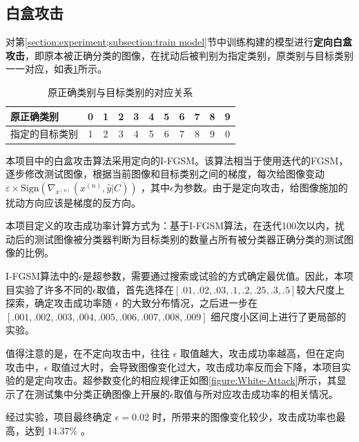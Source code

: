 \documentclass[journal, a4paper]{IEEEtran}
\begin{document}
\subsection{白盒攻击}
\label{section:experiment;subsection:white-box attack}

对第\ref{section:experiment;subsection:train model}节中训练构建的模型进行\textbf{定向白盒攻击}，即原本被正确分类的图像，在扰动后被判别为指定类别，原类别与目标类别一一对应，如表\ref{table:label}所示。

\begin{table}[h]\small
    \centering
    \begin{tabular}{lcccccccccc}
    \toprule
原正确类别 & 0 & 1 & 2 & 3 & 4 & 5 & 6 & 7 & 8 & 9 \\ 
    \midrule
指定的目标类别 & 1 & 2 & 3 & 4 & 5 & 6 & 7 & 8 & 9 & 0 \\
    \bottomrule
    \end{tabular}
    \caption{原正确类别与目标类别的对应关系}
    \label{table:label}
\end{table}

本项目中的白盒攻击算法采用定向的I-FGSM。该算法相当于使用迭代的FGSM，逐步修改测试图像，根据当前图像和目标类别之间的梯度，每次给图像变动 $\varepsilon \times \mathrm{Sign}\left( \nabla_{x^{(n)}}\left({x}^{(n)}, \hat{y} | C \right) \right)$ ，其中$\epsilon$为参数。由于是定向攻击，给图像施加的扰动方向应该是梯度的反方向。

本项目定义的攻击成功率计算方式为：基于I-FGSM算法，在迭代100次以内，扰动后的测试图像被分类器判断为目标类别的数量占所有被分类器正确分类的测试图像的比例。

I-FGSM算法中的$\epsilon$是超参数，需要通过搜索或试验的方式确定最优值。因此，本项目实验了许多不同的$\epsilon$取值，首先选择在$[.01, .02, .03, .1, .2, .25, .3, .5]$较大尺度上探索，确定攻击成功率随 $\epsilon$ 的大致分布情况，之后进一步在 $[.001, .002, .003, .004, .005, .006, .007, .008, .009]$ 细尺度小区间上进行了更局部的实验。

值得注意的是，在不定向攻击中，往往 $\epsilon$ 取值越大，攻击成功率越高，但在定向攻击中，$\epsilon$ 取值过大时，会导致图像变化过大，攻击成功率反而会下降，本项目实验的是定向攻击。超参数变化的相应规律正如图\ref{figure:White-Attack}所示，其显示了在测试集中分类正确图像上开展的$\epsilon$取值与所对应攻击成功率的相关情况。

经过实验，项目最终确定 $\epsilon=0.02$ 时，所带来的图像变化较少，攻击成功率也最高，达到 $14.37\%$ 。
\end{document}
